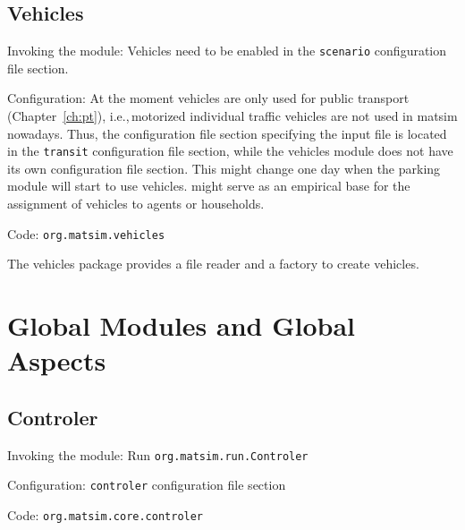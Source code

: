 \subsection{Vehicles}
\label{sec:vehicles}




\begin{compactitem}
\item Invoking the module: Vehicles need to be enabled in the \lstinline|scenario| configuration file section.
\item Configuration: At the moment vehicles are only used for public transport (Chapter~\ref{ch:pt}), i.e.,\,motorized individual traffic vehicles are not used in \gls{matsim} nowadays. Thus, the configuration file section specifying the input file is located in the \lstinline|transit| configuration file section, while the vehicles module does not have its own configuration file section. 
%
This might change one day when the parking module will start to use vehicles. \citet[][]{JaeggiEtAl_TRR_2012} might serve as an empirical base for the assignment of vehicles to agents or households.
\item Code: \lstinline|org.matsim.vehicles|
\end{compactitem}

The vehicles package provides a file reader and a factory to create vehicles.

\section{Global Modules and Global Aspects}
\label{sec:globalmodules}
\subsection{Controler}
\label{sec:controler}
\begin{compactitem}
\item Invoking the module: Run \lstinline|org.matsim.run.Controler|
\item Configuration: \lstinline|controler| configuration file section
\item Code: \lstinline|org.matsim.core.controler|
\end{compactitem}

